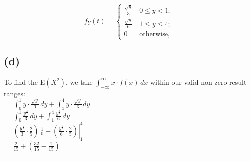 \documentclass{article}
\begin{document}
{\[
f_Y\left(t\right)=\begin{cases}
\frac{\sqrt{y}}{3} & \,0 \leq y < 1;\\
\frac{\sqrt{y}}{6} & \,1 \leq y \leq 4;\\
0 & \,\mbox{otherwise,}
\end{cases}
\]

\subsection*{(d)}
To find the E$(X^2)$, we take $\int_{-\infty}^{\infty}x \cdot f(x) \,dx$ within our valid non-zero-result ranges: \\ 
$ = \int_{0}^{1} y \cdot \frac{\sqrt{y}}{3} \,dy + \int_{1}^{4} y \cdot \frac{\sqrt{y}}{6} \,dy$ \\ 
$ = \int_{0}^{1} \frac{y^{\frac{3}{2}}}{3} \,dy + \int_{1}^{4} \frac{y^{\frac{3}{2}}}{6} \,dy$ \\ 
$ = (\frac{y^{\frac{5}{2}}}{3} \cdot \frac{2}{5})|_{0}^{1} + (\frac{y^{\frac{5}{2}}}{6} \cdot \frac{2}{5})|_{1}^{4} $ \\ 
$ = \frac{2}{15} + (\frac{32}{15} - \frac{1}{15}) $ \\ 
$ = $   \\ 

}
\end{document}
